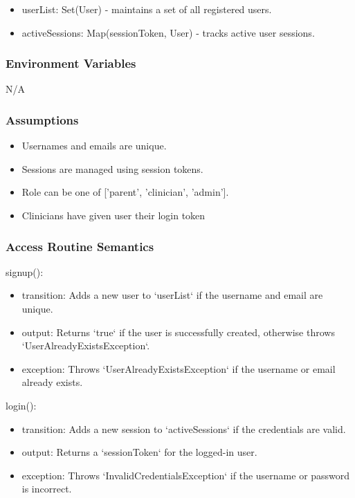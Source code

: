 \documentclass[12pt, titlepage]{article}
\begin{document}
\begin{itemize}
\item userList: Set(User) - maintains a set of all registered users.
\item activeSessions: Map(sessionToken, User) - tracks active user sessions.
\end{itemize}

\subsubsection{Environment Variables}

N/A

\subsubsection{Assumptions}

\begin{itemize}
\item Usernames and emails are unique.
\item Sessions are managed using session tokens.
\item Role can be one of ['parent', 'clinician', 'admin'].
\item Clinicians have given user their login token
\end{itemize}

\subsubsection{Access Routine Semantics}

\noindent signup():
\begin{itemize}
\item transition: Adds a new user to `userList` if the username and email are unique.
\item output: Returns `true` if the user is successfully created, otherwise throws `UserAlreadyExistsException`.
\item exception: Throws `UserAlreadyExistsException` if the username or email already exists.
\end{itemize}

\noindent login():
\begin{itemize}
\item transition: Adds a new session to `activeSessions` if the credentials are valid.
\item output: Returns a `sessionToken` for the logged-in user.
\item exception: Throws `InvalidCredentialsException` if the username or password is incorrect.
\end{itemize}
\end{document}
